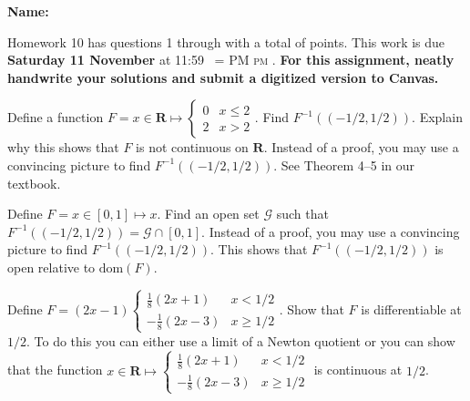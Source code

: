 \documentclass[12pt,fleqn,answers]{exam}
\makeatletter
\newcommand{\reals}{\mathbf{R}}
\newcommand{\dom}{\mbox{dom}}
\newcommand{\quiz}{10}
\newcommand{\term}{Fall}
\DeclareRobustCommand{\maybefakesc}[1]{%
  \ifnum\pdfstrcmp{\f@series}{\bfdefault}=\z@
    {\fontsize{\dimexpr0.8\dimexpr\f@size pt\relax}{0}\selectfont\uppercase{#1}}%
  \else
    \textsc{#1}%
  \fi
}
\newcommand\PM{\,\maybefakesc{pm}\xspace}
\makeatother
\begin{document}
\large
\vspace{0.1in}
\noindent{}
{\bf Name:}  \\
\noindent \makebox[3.0truein][l]{\textbf{Homework \quiz, \term \/ \the\year}}
\vspace{0.1in}

\noindent  Homework \quiz\/  has questions 1 through  \numquestions \/ with a total 
of  \numpoints\/  points. 
This work is due \textbf{Saturday 11 November} at 11:59 \PM.
\textbf{For this assignment, neatly handwrite your solutions and submit
a digitized version to Canvas.}

\vspace{0.1in}


\begin{questions}

 
    \question[10] Define a function $F = x \in \reals \mapsto \begin{cases}
        0 & x \leq  2 \\ 2 & x >  2 \end{cases}$.  Find $F^{-1} \left(\left(-1/2, 1/2\right) \right)$.
        Explain why this shows that $F$ is not continuous on $\reals$.
        Instead of a proof, you may use a convincing picture to find $F^{-1} \left(\left(-1/2, 1/2\right) \right)$.
        See Theorem 4--5 in our textbook.

        \question[10] Define $F = x \in [0,1] \mapsto x$. Find an open set $\mathcal{G}$
        such that $F^{-1}\left(\left(-1/2,1/2\right)\right) = \mathcal{G} \cap [0,1]$.
        Instead of a proof, you may use a convincing picture to find $F^{-1} \left(\left(-1/2, 1/2\right) \right)$.
        This shows that $F^{-1}\left(\left(-1/2,1/2\right)\right)$ is open relative to 
        $\dom(F)$.

        \question[10] Define $F = (2x -1) \begin{cases}  \frac{1}{8} (2x+1) & x < 1/2 \\
        -\frac{1}{8} (2x - 3) & x \geq 1/2 \end{cases}$. Show that 
        $F$ is differentiable at $1/2$. To do this you can either
        use a limit of a Newton quotient or you can show that the
        function $x \in \reals \mapsto \begin{cases}  \frac{1}{8} (2x+1) & x < 1/2 \\
            -\frac{1}{8} (2x - 3) & x \geq 1/2 \end{cases}$ is
            continuous at $1/2$.
        
       
        




\end{questions}
\end{document}
